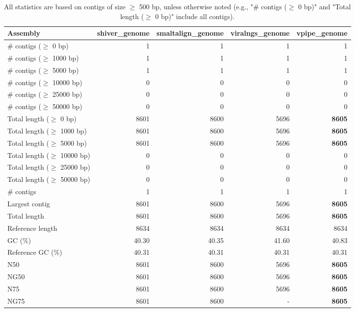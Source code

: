 \documentclass[12pt,a4paper]{article}
\begin{document}
\begin{table}[ht]
\begin{center}
\caption{All statistics are based on contigs of size $\geq$ 500 bp, unless otherwise noted (e.g., "\# contigs ($\geq$ 0 bp)" and "Total length ($\geq$ 0 bp)" include all contigs).}
\begin{tabular}{|l*{4}{|r}|}
\hline
Assembly & shiver\_genome & smaltalign\_genome & viralngs\_genome & vpipe\_genome \\ \hline
\# contigs ($\geq$ 0 bp) & 1 & 1 & 1 & 1 \\ \hline
\# contigs ($\geq$ 1000 bp) & 1 & 1 & 1 & 1 \\ \hline
\# contigs ($\geq$ 5000 bp) & 1 & 1 & 1 & 1 \\ \hline
\# contigs ($\geq$ 10000 bp) & 0 & 0 & 0 & 0 \\ \hline
\# contigs ($\geq$ 25000 bp) & 0 & 0 & 0 & 0 \\ \hline
\# contigs ($\geq$ 50000 bp) & 0 & 0 & 0 & 0 \\ \hline
Total length ($\geq$ 0 bp) & 8601 & 8600 & 5696 & {\bf 8605} \\ \hline
Total length ($\geq$ 1000 bp) & 8601 & 8600 & 5696 & {\bf 8605} \\ \hline
Total length ($\geq$ 5000 bp) & 8601 & 8600 & 5696 & {\bf 8605} \\ \hline
Total length ($\geq$ 10000 bp) & 0 & 0 & 0 & 0 \\ \hline
Total length ($\geq$ 25000 bp) & 0 & 0 & 0 & 0 \\ \hline
Total length ($\geq$ 50000 bp) & 0 & 0 & 0 & 0 \\ \hline
\# contigs & 1 & 1 & 1 & 1 \\ \hline
Largest contig & 8601 & 8600 & 5696 & {\bf 8605} \\ \hline
Total length & 8601 & 8600 & 5696 & {\bf 8605} \\ \hline
Reference length & 8634 & 8634 & 8634 & 8634 \\ \hline
GC (\%) & 40.30 & 40.35 & 41.60 & 40.83 \\ \hline
Reference GC (\%) & 40.31 & 40.31 & 40.31 & 40.31 \\ \hline
N50 & 8601 & 8600 & 5696 & {\bf 8605} \\ \hline
NG50 & 8601 & 8600 & 5696 & {\bf 8605} \\ \hline
N75 & 8601 & 8600 & 5696 & {\bf 8605} \\ \hline
NG75 & 8601 & 8600 & - & {\bf 8605} \\ \hline

\end{tabular}
\end{center}
\end{table}
\end{document}
